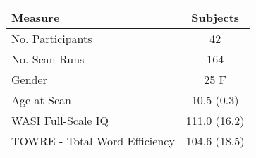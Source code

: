 \begin{tabular}{lc}
\toprule 
Measure & Subjects \\ 
\midrule 
No. Participants				& 42 \\ 
No. Scan Runs					& 164 \\ 
Gender  						& 25 F \\ 
Age at Scan 					& 10.5 (0.3)  \\ 
WASI Full-Scale IQ  			& 111.0 (16.2) \\ 
TOWRE - Total Word Efficiency 	& 104.6 (18.5) \\ 
\bottomrule 
\end{tabular}